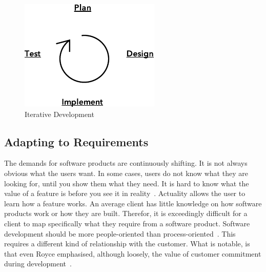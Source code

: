 \documentclass[english]{tktltiki2}
\begin{document}
\begin{figure}[h!]

    \vspace{1cm}
    \centering

    \includegraphics{figures/iterative-development}

    \caption{Iterative Development}
    \label{figure:iterative-development}

\end{figure}

\subsection{Adapting to Requirements}

The demands for software products are continuously shifting. It is not always obvious what the users want. In some cases, users do not know what they are looking for, until you show them what they need. It is hard to know what the value of a feature is before you see it in reality~\cite{Fow05}. Actuality allows the user to learn how a feature works. An average client has little knowledge on how software products work or how they are built. Therefor, it is exceedingly difficult for a client to map specifically what they require from a software product. Software development should be more people-oriented than process-oriented~\cite{Fow05}. This requires a different kind of relationship with the customer. What is notable, is that even Royce emphasised, although loosely, the value of customer commitment during development~\cite{Roy70}.
\end{document}
